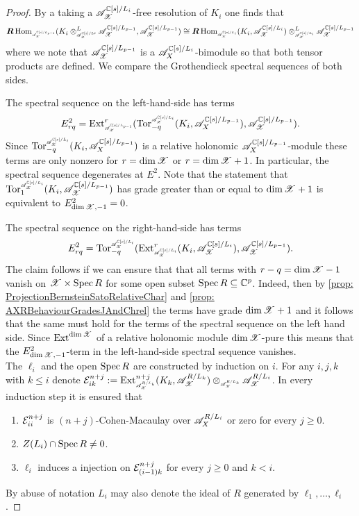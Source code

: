 \begin{proof}
  By a taking a $\mathscr{A}_{\mathscr{X}}^{\mathbb{C}[s]/L_{i}}$-free resolution of $K_i$ one finds that
  $$\bR \Hom_{\scaleto{\A_\X^{ \C[s]/L_{p-1} }}{8pt} }(K_i\otimes^L_{\scaleto{ \A_\X^{\C[s]/L{i}} }{8pt} } \A_\X^{\C[s]/L_{p-1} },\A_\X^{ \C[s]/L_{p-1}} ) \cong \bR \Hom_{ \scaleto{\A_\X^{\C[s]/L_{i}}}{8pt} } (K_i,\A_\X^{\C[s]/L_{i}}) \otimes^L_{\scaleto{ \A_\X^{\C[s]/L_{i}}}{8pt} } \A_\X^{\C[s]/L_{p-1}}$$
  where we note that $\mathscr{A}_{\mathscr{X}}^{\mathbb{C}[s]/L_{p-1}}$ is a $\mathscr{A}_X^{\mathbb{C}[s]/L_{i}}$-bimodule so that both tensor products are defined.
  We compare the Grothendieck spectral sequences of both sides.

  The spectral sequence on the left-hand-side has terms
  $$E_{rq}^2 = \Ex{\A_\X^{\C[s]/L_{p-1}}}{r}(\Tr{\A_\X^{\C[s]/L_{i}} }{-q}(K_i,\A_X^{\C[s]/L_{p-1}}),\A_\X^{\C[s]/L_{p-1}}).$$
  Since $\Tr{\A_\X^{\C[s]/L_{i}} }{-q}(K_i,\A_X^{\C[s]/L_{p-1}})$ is a relative holonomic $\mathscr{A}_X^{\mathbb{C}[s]/L_{p-1}}$-module these terms are only nonzero for $r=\dim \mathscr{X}$ or $r = \dim \mathscr{X}+1$.
  In particular, the spectral sequence degenerates at $E^2$.
  Note that the statement that $\Tr{\A_\X^{\C[s]/L_i}}{1}(K_i, \A_\X^{\C[s]/L_{p-1}})$ has grade greater than or equal to $\dim \mathscr{X}+1$ is equivalent to $E^2_{\dim\mathscr{X},-1} = 0$.

  The spectral sequence on the right-hand-side has terms
  $$E^2_{rq} = \Tr{\A_\X^{\C[s]/L_{i}} }{-q}(\Ex{ \A_\X^{\C[s]/L_{i}} }{r} (K_i,\A_\X^{\C[s]/L_{i}}), \A_\X^{\C[s]/L_{p-1}}).$$
  The claim follows if we can ensure that that all terms with $r-q = \dim \mathscr{X} -1$ vanish on $\mathscr{X}\times\operatorname{Spec} R$ for some open subset $\operatorname{Spec} R\subseteq \mathbb{C}^p$.  %
  Indeed, then by \cref{prop: ProjectionBernsteinSatoRelativeChar} and \cref{prop: AXRBehaviourGradesJAndChrel} the terms have grade $\dim\mathscr{X}+1$ and it follows that the same must hold for the terms of the spectral sequence on the left hand side.
  Since $\operatorname{Ext}^{\dim\mathscr{X}}$ of a relative holonomic module $\dim\mathscr{X}$-pure this means that the $E^2_{\dim\mathscr{X},-1}$-term in the left-hand-side spectral sequence vanishes.
  \\


  The $\ell_i$ and the open $\operatorname{Spec} R$ are constructed by induction on $i$. For any $i,j,k$ with $k\leq i$ denote $\E_{ik}^{n+j}:= \Ex{\A_\X^{R/L_{k}} }{n+j}(K_k, \A_\X^{R/L_k}) \otimes_{\scaleto{\A_\X^{R/L_{k}}}{8pt}} \A_\X^{R/L_{i}}$.
  In every induction step it is ensured that
  \begin{enumerate}[label=(\roman*)]
    \item $\mathcal{E}_{ii}^{n+j}$ is $(n+j)$-Cohen-Macaulay over $\mathscr{A}_X^{R/L_i}$ or zero for every $j\geq 0$.
    \item $Z(L_i)\cap \operatorname{Spec} R \neq 0$.
    \item $\ell_i$ induces a injection on $\mathcal{E}_{(i-1)k}^{n+j}$
    for every $j\geq 0$ and $k<i$.
  \end{enumerate}
  By abuse of notation $L_i$ may also denote the ideal of $R$ generated by $\ell_1,\ldots,\ell_i$.


\end{proof}
